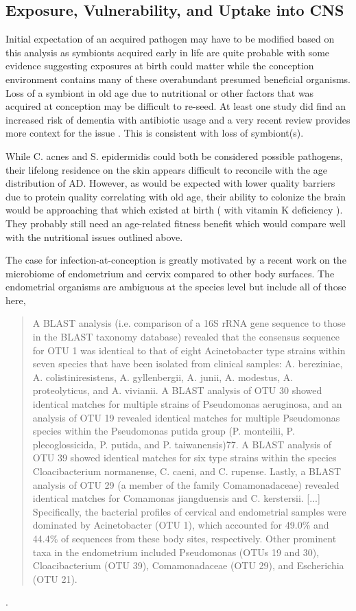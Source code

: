\documentclass[aps,secnumarabic,balancelastpage,amsmath,amssymb,nofootinbib]{revtex4}
\begin{document}
 
\subsection{Exposure, Vulnerability, and Uptake into CNS }
Initial expectation of an acquired pathogen 
may have to be modified based on this analysis 
as symbionts acquired early in life are quite probable
with some evidence suggesting exposures at birth
could matter while the conception environment contains
many of these overabundant presumed beneficial organisms. 
Loss of a symbiont in old age due to nutritional or other
factors that was acquired at conception may be difficult to re-seed.
At least one study did find an increased risk of dementia with
antibiotic usage
\cite{10.3389/fphar.2022.888333}
and a very recent review provides more context for the issue
\cite{KarenMOttemann_2023}. This is consistent with loss
of symbiont(s).

While C. acnes and S. epidermidis could both
be considered possible pathogens, their lifelong
residence on the skin appears difficult to
reconcile with the age distribution of AD.
However, as would be expected with lower quality
barriers due to protein quality correlating
with old age, their ability to colonize
the brain would be approaching that
which existed at birth ( with vitamin K deficiency ).
They probably still need an age-related fitness benefit
which would compare well with the nutritional issues outlined above.

The case for infection-at-conception is greatly 
motivated  by a recent work on the microbiome
of endometrium and cervix compared to other 
body surfaces. The endometrial organisms are ambiguous at
the species level but include all of those here,

\begin{quote}
A BLAST analysis (i.e. comparison of a 16S rRNA gene sequence to those in
the BLAST taxonomy database) revealed that the consensus sequence for OTU
1 was identical to that of eight Acinetobacter type strains within seven
species that have been isolated from clinical samples: A. bereziniae, A.
colistiniresistens, A. gyllenbergii, A. junii, A. modestus, A. proteolyticus,
and A. vivianii. A BLAST analysis of OTU 30 showed identical matches for
multiple strains of Pseudomonas aeruginosa, and an analysis of OTU 19 revealed
identical matches for multiple Pseudomonas species within the Pseudomonas
putida group (P. monteilii, P. plecoglossicida, P. putida, and P. taiwanensis)77.
A BLAST analysis of OTU 39 showed identical matches for six type strains
within the species Cloacibacterium normanense, C. caeni, and C. rupense.
Lastly, a BLAST analysis of OTU 29 (a member of the family Comamonadaceae)
revealed identical matches for Comamonas jiangduensis and C. kerstersii.
[...]
Specifically, the bacterial profiles of cervical and endometrial samples were dominated by Acinetobacter (OTU 1), which accounted for 49.0\% and 44.4\% of sequences from these body sites, respectively. Other prominent taxa in the endometrium included Pseudomonas (OTUs 19 and 30), Cloacibacterium (OTU 39), Comamonadaceae (OTU 29), and Escherichia (OTU 21).

\end{quote}
\cite{Winters_Romero_Gervasi_Does_endometrial_cavity_2019}.
\end{document}
